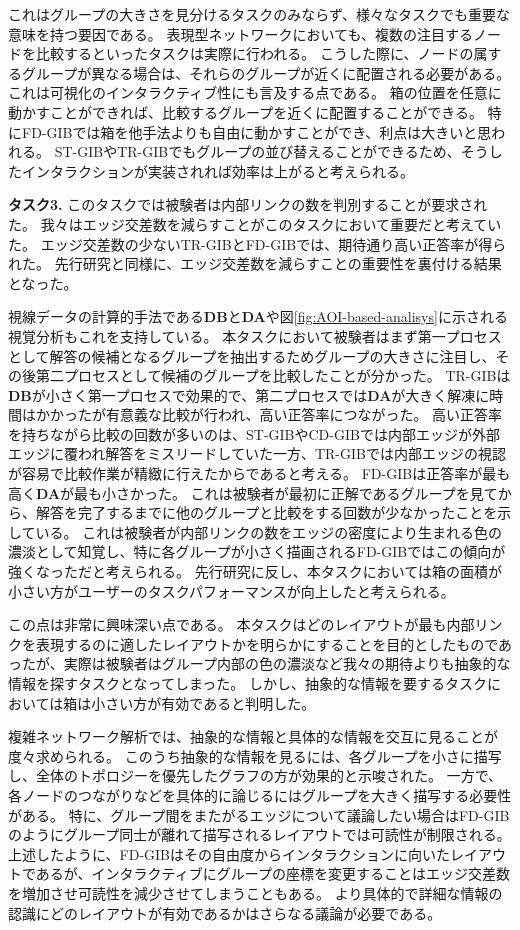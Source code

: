 \documentclass{kuee}
\begin{document}
これはグループの大きさを見分けるタスクのみならず、様々なタスクでも重要な意味を持つ要因である。
表現型ネットワークにおいても、複数の注目するノードを比較するといったタスクは実際に行われる。
こうした際に、ノードの属するグループが異なる場合は、それらのグループが近くに配置される必要がある。
これは可視化のインタラクティブ性にも言及する点である。
箱の位置を任意に動かすことができれば、比較するグループを近くに配置することができる。
特にFD-GIBでは箱を他手法よりも自由に動かすことができ、利点は大きいと思われる。
ST-GIBやTR-GIBでもグループの並び替えることができるため、そうしたインタラクションが実装されれば効率は上がると考えられる。

{\bf タスク3.} このタスクでは被験者は内部リンクの数を判別することが要求された。
我々はエッジ交差数を減らすことがこのタスクにおいて重要だと考えていた。
エッジ交差数の少ないTR-GIBとFD-GIBでは、期待通り高い正答率が得られた。
先行研究と同様に、エッジ交差数を減らすことの重要性を裏付ける結果となった。

視線データの計算的手法である{\bf DB}と{\bf DA}や図\ref{fig:AOI-based-analisys}に示される視覚分析もこれを支持している。
本タスクにおいて被験者はまず第一プロセスとして解答の候補となるグループを抽出するためグループの大きさに注目し、その後第二プロセスとして候補のグループを比較したことが分かった。
TR-GIBは{\bf DB}が小さく第一プロセスで効果的で、第二プロセスでは{\bf DA}が大きく解凍に時間はかかったが有意義な比較が行われ、高い正答率につながった。
高い正答率を持ちながら比較の回数が多いのは、ST-GIBやCD-GIBでは内部エッジが外部エッジに覆われ解答をミスリードしていた一方、TR-GIBでは内部エッジの視認が容易で比較作業が精緻に行えたからであると考える。
FD-GIBは正答率が最も高く{\bf DA}が最も小さかった。
これは被験者が最初に正解であるグループを見てから、解答を完了するまでに他のグループと比較をする回数が少なかったことを示している。
これは被験者が内部リンクの数をエッジの密度により生まれる色の濃淡として知覚し、特に各グループが小さく描画されるFD-GIBではこの傾向が強くなっただと考えられる。
先行研究に反し、本タスクにおいては箱の面積が小さい方がユーザーのタスクパフォーマンスが向上したと考えられる。

この点は非常に興味深い点である。
本タスクはどのレイアウトが最も内部リンクを表現するのに適したレイアウトかを明らかにすることを目的としたものであったが、実際は被験者はグループ内部の色の濃淡など我々の期待よりも抽象的な情報を探すタスクとなってしまった。
しかし、抽象的な情報を要するタスクにおいては箱は小さい方が有効であると判明した。

複雑ネットワーク解析では、抽象的な情報と具体的な情報を交互に見ることが度々求められる。
このうち抽象的な情報を見るには、各グループを小さに描写し、全体のトポロジーを優先したグラフの方が効果的と示唆された。
一方で、各ノードのつながりなどを具体的に論じるにはグループを大きく描写する必要性がある。
特に、グループ間をまたがるエッジについて議論したい場合はFD-GIBのようにグループ同士が離れて描写されるレイアウトでは可読性が制限される。
上述したように、FD-GIBはその自由度からインタラクションに向いたレイアウトであるが、インタラクティブにグループの座標を変更することはエッジ交差数を増加させ可読性を減少させてしまうこともある。
より具体的で詳細な情報の認識にどのレイアウトが有効であるかはさらなる議論が必要である。
\end{document}
